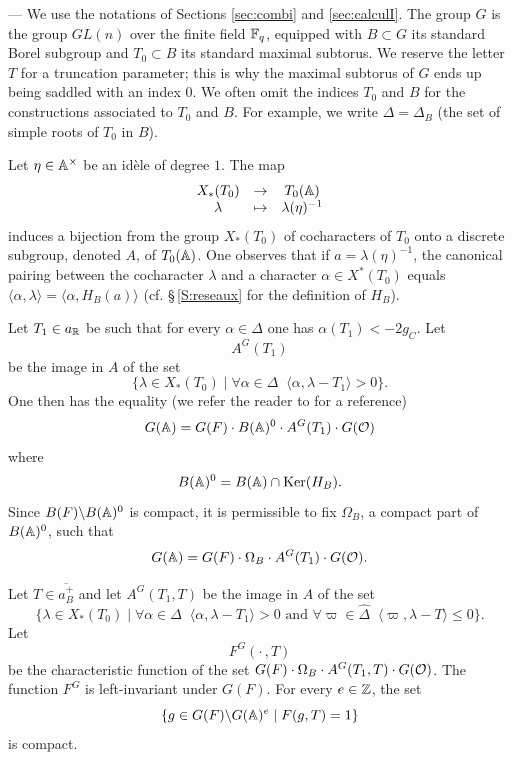 \begin{paragr} ---\label{S:reduction-arthur}
We use the notations of Sections \ref{sec:combi} and \ref{sec:calculI}. The group $G$ is the group $GL(n)$ over the finite field $\mathbb{F}_q$, equipped with $B\subset G$ its standard Borel subgroup and $T_0\subset B$ its standard maximal subtorus. We reserve the letter $T$ for a truncation parameter; this is why the maximal subtorus of $G$ ends up being saddled with an index $0$. We often omit the indices $T_0$ and $B$ for the constructions associated to $T_0$ and $B$. For example, we write $\Delta=\Delta_B$ (the set of simple roots of $T_0$ in $B$).

Let $\eta\in \mathbb{A}^\times$ be an id\`{e}le of degree $1$. The map
\begin{equation}
  \label{eq:cocaractere}
  \begin{array}{ccc}
    X_*(T_0) & \to & T_0(\mathbb{A})\\
    \lambda & \mapsto & \lambda(\eta)^{-1}
  \end{array}
\end{equation}
induces a bijection from the group $X_*(T_0)$ of cocharacters of $T_0$ onto a discrete subgroup, denoted $A$, of $T_0(\mathbb{A})$. One observes that if $a=\lambda(\eta)^{-1}$, the canonical pairing between the cocharacter $\lambda$ and a character $\alpha\in X^*(T_0)$ equals $\langle \alpha,\lambda\rangle=\langle \alpha,H_B(a)\rangle$ (cf. \S\,\ref{S:reseaux} for the definition of $H_B$).

Let $T_1\in a_{\mathbb{R}}$ be such that for every $\alpha\in \Delta$ one has $\alpha(T_1)<-2g_C$. Let
$$A^G(T_1)$$
be the image in $A$ of the set
$$\{\lambda\in X_*(T_0)\mid \forall \alpha\in \Delta \;\; \langle \alpha,\lambda-T_1\rangle >0\}.$$
One then has the equality (we refer the reader to \cite{harder} for a reference)
$$G(\mathbb{A})=G(F)\cdot B(\mathbb{A})^0\cdot A^G(T_1)\cdot G(\mathcal{O})$$
where
$$B(\mathbb{A})^0=B(\mathbb{A})\cap \mathrm{Ker}(H_B).$$
Since $B(F)\backslash B(\mathbb{A})^0$ is compact, it is permissible to fix $\Omega_B$, a compact part of $B(\mathbb{A})^0$, such that
$$G(\mathbb{A})=G(F)\cdot \Omega_B\cdot A^G(T_1)\cdot G(\mathcal{O}).$$

Let $T\in \overline{a_B^+}$ and let $A^G(T_1,T)$ be the image in $A$ of the set
$$\{\lambda\in X_*(T_0)\mid \forall \alpha\in \Delta \;\; \langle \alpha,\lambda-T_1\rangle >0 \text{ and } \forall \varpi\in \hat{\Delta} \;\; \langle \varpi,\lambda-T\rangle \leq 0\}.$$
Let
$$F^G(\cdot\,,T)$$
be the characteristic function of the set $G(F)\cdot \Omega_B\cdot A^G(T_1,T)\cdot G(\mathcal{O})$. The function $F^G$ is left-invariant under $G(F)$. For every $e\in \mathbb{Z}$, the set
$$\{g\in G(F)\backslash G(\mathbb{A})^e\mid F(g,T)=1\}$$
is compact.


\end{paragr}
